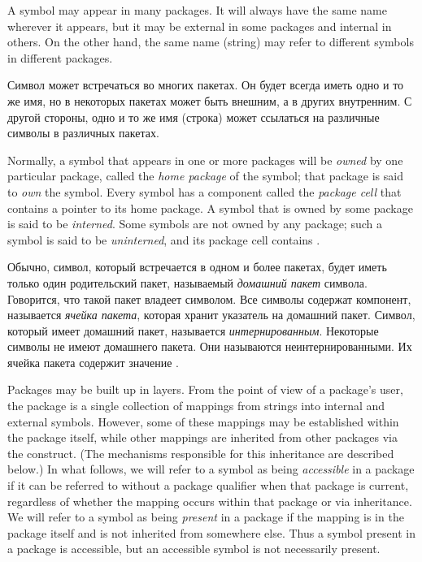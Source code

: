 A symbol may appear in many packages.  It will always have the same
name wherever it appears, but it may be external in some packages
and internal in others.  On the other hand,
the same name (string) may refer to different symbols in
different packages.

Символ может встречаться во многих пакетах. Он будет всегда иметь одно и то же
имя, но в некоторых пакетах может быть внешним, а в других внутренним. С другой
стороны, одно и то же имя (строка) может ссылаться на различные символы в
различных пакетах.

Normally, a symbol that appears in one or more packages
will be \emph{owned} by one particular package, called the \emph{home package}
of the symbol; that package is said to \emph{own} the symbol.
Every symbol has a component called the \emph{package cell}
that contains a pointer to its home package.
A symbol that is owned by some package is said to be \emph{interned}.
Some symbols are not owned by any package; such a symbol
is said to be \emph{uninterned}, and its package cell contains {\false}.

Обычно, символ, который встречается в одном и более пакетах, будет иметь только
один родительский пакет, называемый \emph{домашний пакет} символа. Говорится,
что такой пакет владеет символом.
Все символы содержат компонент, называется \emph{ячейка пакета}, которая хранит
указатель на домашний пакет.
Символ, который имеет домашний пакет, называется \emph{интернированным}.
Некоторые символы не имеют домашнего пакета. Они называются
неинтернированными. Их ячейка пакета содержит значение {\false}.

Packages may be built up in layers.  From the point of view of a
package's user, the package is a single collection of mappings from
strings into internal and external symbols.  However, some of these
mappings may be established within the package itself, while other
mappings are inherited from other packages via the 
construct.  (The mechanisms responsible for this inheritance are
described below.)  In what follows, we will refer to a symbol as being
\emph{accessible} in a package if it can be referred to
without a package qualifier when that package is current,
regardless of whether the mapping occurs within
that package or via inheritance.   We will refer to a symbol as being
\emph{present} in a package if the mapping is in the package itself and is
not inherited from somewhere else.  Thus a symbol present in a package is accessible,
but an accessible symbol is not necessarily present.

